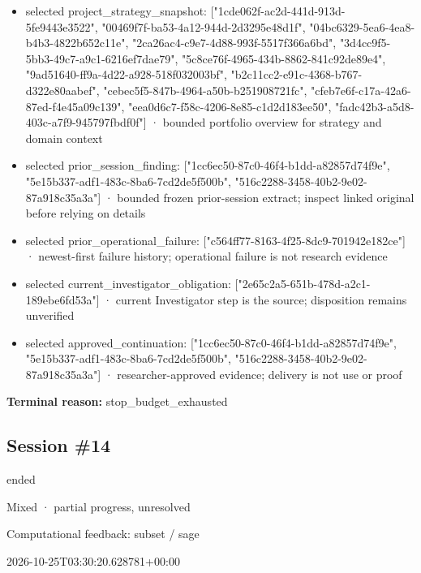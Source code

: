 \documentclass[11pt]{article}
\begin{document}
\begin{itemize}
\item selected project\_strategy\_snapshot: ["1cde062f-ac2d-441d-913d-5fe9443e3522", "00469f7f-ba53-4a12-944d-2d3295e48d1f", "04bc6329-5ea6-4ea8-b4b3-4822b652c11e", "2ca26ac4-c9e7-4d88-993f-5517f366a6bd", "3d4cc9f5-5bb3-49c7-a9c1-6216ef7dae79", "5c8ce76f-4965-434b-8862-841c92de89e4", "9ad51640-ff9a-4d22-a928-518f032003bf", "b2c11cc2-e91c-4368-b767-d322e80aabef", "cebec5f5-847b-4964-a50b-b251908721fc", "cfeb7e6f-c17a-42a6-87ed-f4e45a09c139", "eea0d6c7-f58c-4206-8e85-c1d2d183ee50", "fadc42b3-a5d8-403c-a7f9-945797fbdf0f"] · bounded portfolio overview for strategy and domain context
\item selected prior\_session\_finding: ["1cc6ec50-87c0-46f4-b1dd-a82857d74f9e", "5e15b337-adf1-483c-8ba6-7cd2de5f500b", "516c2288-3458-40b2-9e02-87a918c35a3a"] · bounded frozen prior-session extract; inspect linked original before relying on details
\item selected prior\_operational\_failure: ["c564ff77-8163-4f25-8dc9-701942e182ce"] · newest-first failure history; operational failure is not research evidence
\item selected current\_investigator\_obligation: ["2e65c2a5-651b-478d-a2c1-189ebe6fd53a"] · current Investigator step is the source; disposition remains unverified
\item selected approved\_continuation: ["1cc6ec50-87c0-46f4-b1dd-a82857d74f9e", "5e15b337-adf1-483c-8ba6-7cd2de5f500b", "516c2288-3458-40b2-9e02-87a918c35a3a"] · researcher-approved evidence; delivery is not use or proof
\end{itemize}
\textbf{Terminal reason:} stop\_budget\_exhausted\par
\subsection{Session \#14}
\begin{description}[style=nextline,font=\normalfont\bfseries,leftmargin=0pt,labelsep=0pt]
\item[Execution status] ended
\item[Outcome] Mixed · partial progress, unresolved
\item[Strategy] Computational feedback: subset / sage
\item[Started] 2026-10-25T03:30:20.628781+00:00
\end{description}
\end{document}
